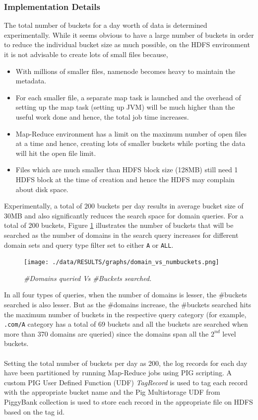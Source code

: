 \documentclass[11pt,a4paper]{article}
\newcommand{\resitem}[1]{\item #1 \vspace{-7pt}}
\begin{document}
\subsubsection{Implementation Details}
The total number of buckets for a day worth of data is determined experimentally. While it seems obvious to have a large number of buckets in order to reduce the individual bucket size as much possible, on the HDFS environment it is not advisable to create lots of small files because,
\begin{itemize}
    \item {With millions of smaller files, namenode becomes heavy to maintain the metadata.}
    \resitem {For each smaller file, a separate map task is launched and the overhead of setting up the map task (setting up JVM) will be much higher than the useful work done and hence, the total job time increases.}
    \resitem {Map-Reduce environment has a limit on the maximum number of open files at a time and hence, creating lots of smaller buckets while porting the data will hit the open file limit.}
    \resitem {Files which are much smaller than HDFS block size (128MB) still need 1 HDFS block at the time of creation and hence the HDFS may complain about disk space.}
\end{itemize}

\noindent
Experimentally, a total of $200$ buckets per day results in average  bucket size of 30MB and also significantly reduces the search space for domain queries. For a total of 200 buckets, Figure \ref{doms} illustrates the number of buckets that will be searched as the number of domains in the search query increases for different domain sets and query type filter set to either \texttt{A} or \texttt{ALL}.

\begin{figure}[H] 
\centering
\texttt{[image: ./data/RESULTS/graphs/domain\_vs\_numbuckets.png]}
\caption {\textit{\#Domains queried Vs \#Buckets searched.}}
\label{doms}
\end{figure}

\noindent
In all four types of queries, when the number of domains is lesser, the \#buckets searched is also lesser. But as the \#domains increase, the \#buckets searched hits the maximum number of buckets in the respective query category (for example, \texttt{.com/A} category has a total of 69 buckets and all the buckets are searched when more than 370 domains are queried) since the domains span all the $2^{nd}$ level buckets.
\\\\
Setting the total number of buckets per day as 200, the log records for each day have been partitioned by running Map-Reduce jobs using PIG scripting. A custom PIG User Defined Function (UDF) \textit{TagRecord} is used to tag each record with the appropriate bucket name and the Pig Multistorage UDF from PiggyBank collection is used to store each record in the appropriate file on HDFS based on the tag id.
\end{document}
